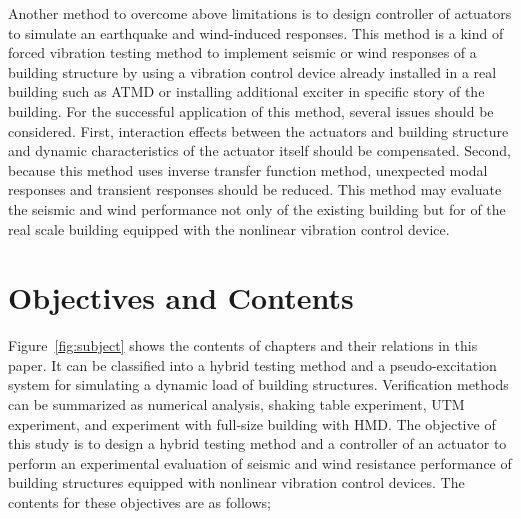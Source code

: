Another method to overcome above limitations is to design controller of actuators to simulate an earthquake and wind-induced responses. This method is a kind of forced vibration testing method to implement seismic or wind responses of a building structure by using a vibration control device already installed in a real building such as ATMD or installing additional exciter in specific story of the building. For the successful application of this method, several issues should be considered. First, interaction effects between the actuators and building structure and dynamic characteristics of the actuator itself should be compensated. Second, because this method uses inverse transfer function method, unexpected modal responses and transient responses should be reduced. This method may evaluate the seismic and wind performance not only of the existing building but for of the real scale building equipped with the nonlinear vibration control device.


\section{Objectives and Contents}
Figure~\ref{fig:subject} shows the contents of chapters and their relations in this paper. It can be classified into a hybrid testing method and a pseudo-excitation system for simulating a dynamic load of building structures. Verification methods can be summarized as numerical analysis, shaking table experiment, UTM experiment, and experiment with full-size building with HMD. The objective of this study is to design a hybrid testing method and a controller of an actuator to perform an experimental evaluation of seismic and wind resistance performance of building structures equipped with nonlinear vibration control devices. The contents for these objectives are as follows;


